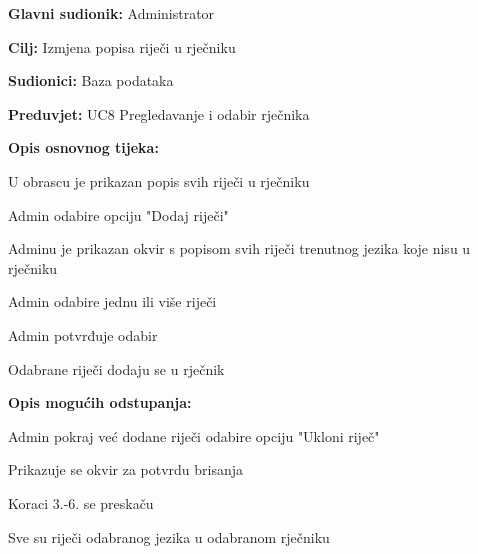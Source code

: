 \noindent {}
\begin{packed_item}

	\item \textbf{Glavni sudionik: } Administrator
	\item \textbf{Cilj: } Izmjena popisa riječi u rječniku
	\item \textbf{Sudionici: } Baza podataka
	\item \textbf{Preduvjet: } UC8 Pregledavanje i odabir rječnika
	\item  \textbf{Opis osnovnog tijeka:}
	
	\item[] \begin{packed_enum}
		
		\item U obrascu je prikazan popis svih riječi u rječniku
		\item Admin odabire opciju "Dodaj riječi"
		\item Adminu je prikazan okvir s popisom svih riječi trenutnog jezika koje nisu u rječniku
		\item Admin odabire jednu ili više riječi
		\item Admin potvrđuje odabir
		\item Odabrane riječi dodaju se u rječnik

	\end{packed_enum}

	\item  \textbf{Opis mogućih odstupanja:}
	
	\item[] \begin{packed_item}

		\item[2.a] Admin pokraj već dodane riječi odabire opciju "Ukloni riječ"
		\item[] \begin{packed_enum}
			
			\item Prikazuje se okvir za potvrdu brisanja 
			\item Koraci 3.-6. se preskaču
			
		\end{packed_enum}

		\item[3.a] Sve su riječi odabranog jezika u odabranom rječniku
		\item[] \begin{packed_enum}
			

\end{packed_enum}
\end{packed_item}
\end{packed_item}
